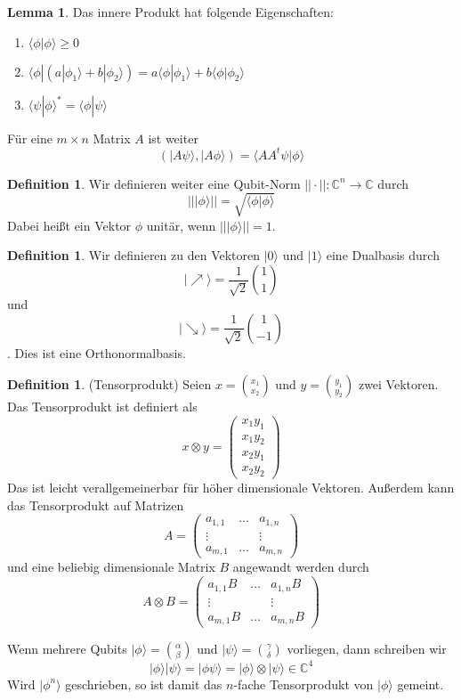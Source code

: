 \documentclass[a4paper, 12pt]{article}
\theoremstyle{plain}
\theoremstyle{definition}
\newtheorem{definition}[theorem]{Definition} %
\theoremstyle{lemma}
\newtheorem{lemma}[theorem]{Lemma}
\theoremstyle{remark}
\theoremstyle{example}
\begin{document}
	\begin{lemma}
		Das innere Produkt hat folgende Eigenschaften:
		\begin{enumerate}
			\item $\langle \phi | \phi \rangle \geq 0$
			\item $\langle \phi | (a|\phi_1 \rangle + b|\phi_2 \rangle) = a \langle \phi | \phi_1 \rangle + b \langle \phi | \phi_2 \rangle$
			\item $\langle \psi | \phi\rangle^* = \langle \phi | \psi \rangle$
		\end{enumerate}
		Für eine $m\times n$ Matrix $A$ ist weiter \[(|A\psi \rangle , |A\phi \rangle) = \langle AA^t \psi | \phi \rangle\]
	\end{lemma}
	\begin{definition}
		Wir definieren weiter eine Qubit-Norm $||\cdot||: \mathbb{C}^n \to \mathbb{C}$ durch \[|||\phi \rangle || = \sqrt{\langle \phi | \phi \rangle}\]
		Dabei heißt ein Vektor $\phi$ unitär, wenn $|||\phi \rangle|| = 1$.
	\end{definition}
	
	\begin{definition}
		Wir definieren zu den Vektoren $|0\rangle$ und $|1\rangle$ eine Dualbasis durch $$|\nearrow\rangle = \frac{1}{\sqrt{2}}\binom{1}{1}$$ und $$|\searrow\rangle = \frac{1}{\sqrt{2}}\binom{1}{-1}$$. Dies ist eine Orthonormalbasis.
	\end{definition}
	
	\begin{definition}(Tensorprodukt)
		Seien $x = \binom{x_1}{x_2}$ und $y = \binom{y_1}{y_2}$ zwei Vektoren. Das Tensorprodukt ist definiert als \[x \otimes y = \begin{pmatrix}
			x_1y_1\\
			x_1y_2\\
			x_2y_1\\
			x_2y_2
		\end{pmatrix}\]
		Das ist leicht verallgemeinerbar für höher dimensionale Vektoren. Außerdem kann das Tensorprodukt auf Matrizen \[A = \begin{pmatrix}
			a_{1,1} & \dots & a_{1,n}\\
			\vdots & & \vdots\\
			a_{m,1} & \dots & a_{m,n}
		\end{pmatrix}\] und eine beliebig dimensionale Matrix $B$ angewandt werden durch \[A \otimes B = \begin{pmatrix}
			a_{1,1}B & \dots & a_{1,n}B\\
			\vdots & & \vdots\\
			a_{m,1}B & \dots & a_{m,n}B
		\end{pmatrix}\]
	\end{definition}
	Wenn mehrere Qubits $|\phi\rangle = \binom{\alpha}{\beta}$ und $|\psi\rangle =  \binom{\gamma}{\delta}$ vorliegen, dann schreiben wir \[|\phi\rangle |\psi\rangle = |\phi \psi \rangle = |\phi\rangle \otimes |\psi\rangle \in \mathbb{C}^4\]
	Wird $|\phi^n\rangle$ geschrieben, so ist damit das $n$-fache Tensorprodukt von $|\phi\rangle$ gemeint. 
	
\end{document}
